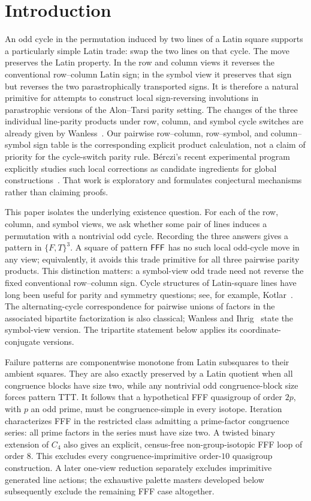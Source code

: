 \section{Introduction}

An odd cycle in the permutation induced by two lines of a Latin square
supports a particularly simple Latin trade: swap the two lines on that cycle.
The move preserves the Latin property.  In the row and column views it
reverses the conventional row--column Latin sign; in the symbol view it
preserves that sign but reverses the two parastrophically transported signs.
It is therefore a natural primitive for attempts to construct local
sign-reversing involutions in parastrophic versions of the Alon--Tarsi parity
setting. The changes of the three individual line-parity products under row,
column, and symbol cycle switches are already given by
Wanless~\cite[Proposition~1]{Wanless2004CycleSwitches}. Our pairwise
row--column, row--symbol, and column--symbol sign table is the corresponding
explicit product calculation, not a claim of priority for the cycle-switch
parity rule. B\'erczi's
recent experimental program explicitly studies such local corrections as
candidate ingredients for global constructions~\cite{Berczi2026}.  That work
is exploratory and formulates conjectural mechanisms rather than claiming
proofs.

This paper isolates the underlying existence question.  For each of the row,
column, and symbol views, we ask whether some pair of lines induces a
permutation with a nontrivial odd cycle.  Recording the three answers gives a
pattern in $\{F,T\}^3$.  A square of pattern $\mathsf{FFF}$ has no such local
odd-cycle move in any view; equivalently, it avoids this trade primitive for
all three pairwise parity products.  This distinction matters: a symbol-view
odd trade need not reverse the fixed conventional row--column sign.  Cycle
structures of Latin-square lines have long been useful for parity and
symmetry questions; see, for example, Kotlar~\cite{Kotlar2012}. The
alternating-cycle correspondence for pairwise unions of factors in the
associated bipartite factorization is also classical; Wanless and
Ihrig~\cite[Section~3]{WanlessIhrig2005Factorizations} state the
symbol-view version. The tripartite statement below applies its
coordinate-conjugate versions.

Failure patterns are componentwise monotone from Latin subsquares to their
ambient squares.  They are also
exactly preserved by a Latin quotient when all congruence blocks have size
two, while any nontrivial odd congruence-block size forces pattern TTT.  It
follows that a hypothetical FFF quasigroup of order $2p$, with $p$ an odd
prime, must be congruence-simple in every isotope.  Iteration characterizes
FFF in the restricted class admitting a prime-factor congruence series:
all prime factors in the series must have size two.  A twisted binary
extension of $C_4$ also gives an explicit,
census-free non-group-isotopic FFF loop of order $8$.  This excludes every
congruence-imprimitive order-$10$ quasigroup construction.  A later
one-view reduction separately excludes imprimitive generated line actions;
the exhaustive palette masters developed below subsequently exclude the
remaining FFF case altogether.

